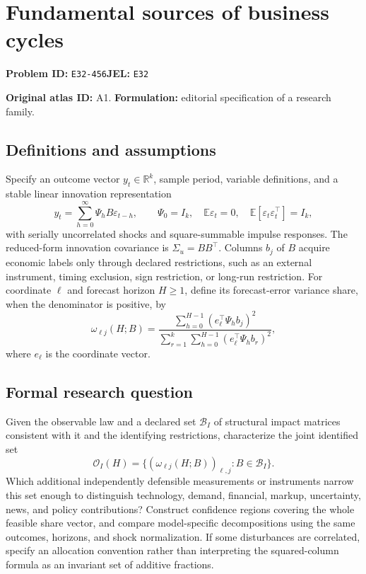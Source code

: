 \documentclass[11pt,a4paper]{article}
\begin{document}
\section*{Fundamental sources of business cycles}
\textbf{Problem ID:} \texttt{E32-456}\quad \textbf{JEL:} \texttt{E32}\par
\label{problem:OP-0011}
\label{atlas:prob:A1}

\noindent\textbf{Original atlas ID:} A1. \textbf{Formulation:} editorial specification of a research family.

\subsection*{Definitions and assumptions}

Specify an outcome vector $y_t\in\mathbb R^k$, sample period, variable definitions, and a stable linear innovation representation
\[
y_t=\sum_{h=0}^\infty\Psi_h B\varepsilon_{t-h},\qquad
 \Psi_0=I_k,\quad\mathbb E\varepsilon_t=0,\quad
 \mathbb E[\varepsilon_t\varepsilon_t^\top]=I_k,
\]
with serially uncorrelated shocks and square-summable impulse responses. The reduced-form innovation covariance is $\Sigma_u=BB^\top$. Columns $b_j$ of $B$ acquire economic labels only through declared restrictions, such as an external instrument, timing exclusion, sign restriction, or long-run restriction. For coordinate $\ell$ and forecast horizon $H\ge1$, define its forecast-error variance share, when the denominator is positive, by
\[
\omega_{\ell j}(H;B)=
\frac{\sum_{h=0}^{H-1}(e_\ell^\top\Psi_h b_j)^2}
 {\sum_{r=1}^k\sum_{h=0}^{H-1}(e_\ell^\top\Psi_h b_r)^2},
\]
where $e_\ell$ is the coordinate vector.

\subsection*{Formal research question}

Given the observable law and a declared set $\mathcal B_I$ of structural impact matrices consistent with it and the identifying restrictions, characterize the joint identified set
\[
\mathcal O_I(H)=\{(\omega_{\ell j}(H;B))_{\ell,j}:B\in\mathcal B_I\}.
\]
Which additional independently defensible measurements or instruments narrow this set enough to distinguish technology, demand, financial, markup, uncertainty, news, and policy contributions? Construct confidence regions covering the whole feasible share vector, and compare model-specific decompositions using the same outcomes, horizons, and shock normalization. If some disturbances are correlated, specify an allocation convention rather than interpreting the squared-column formula as an invariant set of additive fractions.
\end{document}
